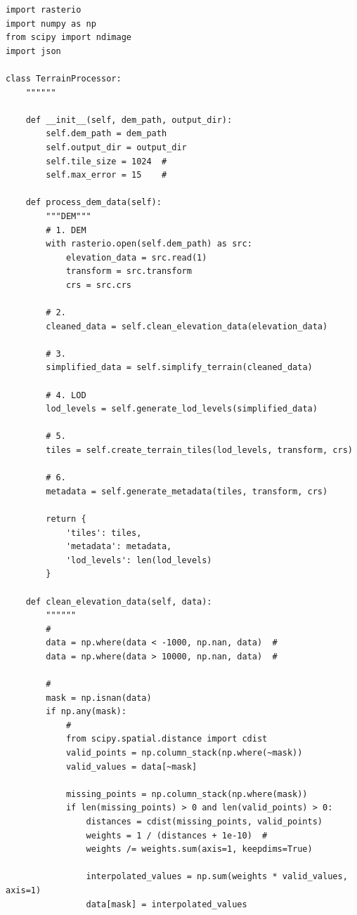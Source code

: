 \begin{lstlisting}[style=python]
import rasterio
import numpy as np
from scipy import ndimage
import json

class TerrainProcessor:
    """"""
    
    def __init__(self, dem_path, output_dir):
        self.dem_path = dem_path
        self.output_dir = output_dir
        self.tile_size = 1024  # 
        self.max_error = 15    # 
        
    def process_dem_data(self):
        """DEM"""
        # 1. DEM
        with rasterio.open(self.dem_path) as src:
            elevation_data = src.read(1)
            transform = src.transform
            crs = src.crs
            
        # 2. 
        cleaned_data = self.clean_elevation_data(elevation_data)
        
        # 3. 
        simplified_data = self.simplify_terrain(cleaned_data)
        
        # 4. LOD
        lod_levels = self.generate_lod_levels(simplified_data)
        
        # 5. 
        tiles = self.create_terrain_tiles(lod_levels, transform, crs)
        
        # 6. 
        metadata = self.generate_metadata(tiles, transform, crs)
        
        return {
            'tiles': tiles,
            'metadata': metadata,
            'lod_levels': len(lod_levels)
        }
    
    def clean_elevation_data(self, data):
        """"""
        # 
        data = np.where(data < -1000, np.nan, data)  # 
        data = np.where(data > 10000, np.nan, data)  # 
        
        # 
        mask = np.isnan(data)
        if np.any(mask):
            # 
            from scipy.spatial.distance import cdist
            valid_points = np.column_stack(np.where(~mask))
            valid_values = data[~mask]
            
            missing_points = np.column_stack(np.where(mask))
            if len(missing_points) > 0 and len(valid_points) > 0:
                distances = cdist(missing_points, valid_points)
                weights = 1 / (distances + 1e-10)  # 
                weights /= weights.sum(axis=1, keepdims=True)
                
                interpolated_values = np.sum(weights * valid_values, axis=1)
                data[mask] = interpolated_values
        

\end{lstlisting}
